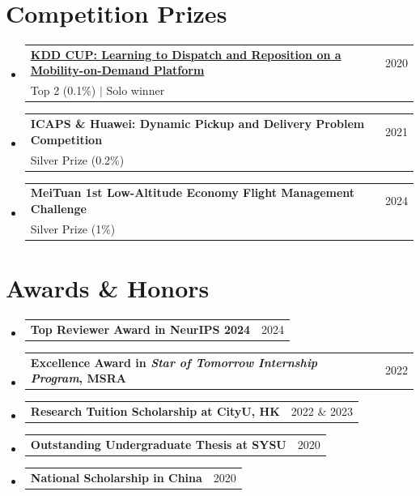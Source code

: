 \documentclass[letterpaper,11pt]{article}
\makeatletter
\newcommand{\resumeSubheading}[4]{
  \vspace{-2pt}\item
    \begin{tabular*}{0.97\textwidth}[t]{l@{\extracolsep{\fill}}r}
      \textbf{#1} & #2 \\
      {\small#3} & {\small #4} \\
    \end{tabular*}\vspace{-7pt}
}
\newcommand{\resumeSubSubheading}[2]{
    \vspace{-2pt}\item
    \begin{tabular*}{0.97\textwidth}{l@{\extracolsep{\fill}}r}
      \textbf{#1} & #2 \\
    \end{tabular*}
    \vspace{-5pt}
}
\newcommand{\resumeSubHeadingListStart}{\begin{itemize}[leftmargin=0.15in, label={}]}
\newcommand{\resumeSubHeadingListEnd}{\end{itemize}}
\makeatother
\begin{document}


\section{\LARGE Competition Prizes}
\vspace{5pt}
\resumeSubHeadingListStart
\resumeSubheading
{\href{https://www.biendata.xyz/competition/kdd_didi/winners/}{KDD CUP: Learning to Dispatch and Reposition on a Mobility-on-Demand Platform}}{2020}
{Top 2 (0.1\%) $|$ Solo winner  }{}
\vspace{5pt}

\resumeSubheading
{ICAPS \& Huawei: Dynamic Pickup and Delivery Problem Competition}{2021}
{Silver Prize (0.2\%)}{}
\vspace{5pt}

\resumeSubheading
{MeiTuan 1st Low-Altitude Economy Flight Management Challenge}{2024}
{Silver Prize (1\%)}{}
\vspace{5pt}


\resumeSubHeadingListEnd






\section{\LARGE Awards \& Honors}
\vspace{5pt}
\resumeSubHeadingListStart

\resumeSubSubheading
{{Top Reviewer Award in NeurIPS 2024}}{2024}
\vspace{1pt}

\resumeSubSubheading
{Excellence Award in \textit{Star of Tomorrow Internship Program}, MSRA}{2022}
\vspace{1pt}

\resumeSubSubheading
{Research Tuition Scholarship at CityU, HK}{2022 \& 2023}
\vspace{1pt}

\resumeSubSubheading
{Outstanding Undergraduate Thesis at SYSU}{2020}
\vspace{1pt}

\resumeSubSubheading
{National Scholarship in China}{2020}
\vspace{1pt}
 
\resumeSubHeadingListEnd
\end{document}

